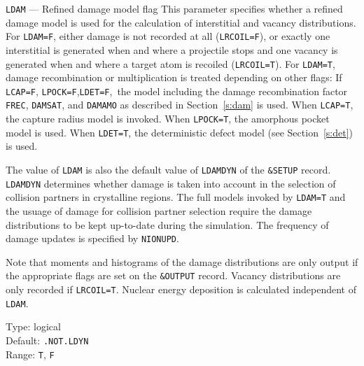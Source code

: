 \begin{keydescription}{\texttt{LDAM} --- Refined damage model flag}
%
  This parameter specifies whether a refined damage model is used for the
  calculation of interstitial and vacancy distributions. For \texttt{LDAM=F},
  either damage is not recorded at all (\texttt{LRCOIL=F}), or exactly
  one interstitial is generated when and where a projectile stops
  and one vacancy is generated when and where a target atom is recoiled 
  (\texttt{LRCOIL=T}). For \texttt{LDAM=T}, damage recombination or
  multiplication is treated depending on other flags: If \texttt{LCAP=F}, 
  \texttt{LPOCK=F},\ifprivate \texttt{LDET=F},\fi\ 
  the model including the damage recombination factor \texttt{FREC}, 
  \texttt{DAMSAT}, and \texttt{DAMAMO} as described in Section~\ref{s:dam} is 
  used. When \texttt{LCAP=T}, the capture radius model is invoked. When 
  \texttt{LPOCK=T}, the amorphous pocket model is used. \ifprivate When 
  \texttt{LDET=T}, the deterministic defect model (see Section~\ref{s:det}) is 
  used.\fi 
  
  The value of \texttt{LDAM} is also the default value of \texttt{LDAMDYN} of
  the \texttt{\&SETUP} record. \texttt{LDAMDYN} determines whether damage is 
  taken into account in the selection of collision partners in crystalline 
  regions. The full models invoked by \texttt{LDAM=T} and the usuage of damage 
  for collision partner selection require the damage distributions to be kept 
  up-to-date during the simulation. The frequency of damage updates is 
  specified by \texttt{NIONUPD}.
  
  Note that moments and histograms of the damage distributions are only output
  if the appropriate flags are set on the \texttt{\&OUTPUT} record.  Vacancy 
  distributions are only recorded if \texttt{LRCOIL=T}. Nuclear
  energy deposition is calculated independent of \texttt{LDAM}.  
  \begin{keytab}
    Type:    \> logical \\
    Default: \> \texttt{.NOT.LDYN} \\
    Range:   \> \texttt{T}, \texttt{F}
  \end{keytab}
\end{keydescription}

